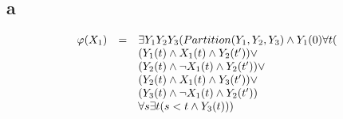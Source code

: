 \documentclass[10pt]{article}
\begin{document}
    \subsection*{a}
      \begin{displaymath}
        \begin{array}{c c l}
          \varphi(X_{1}) & = & 
            \exists Y_{1} Y_{2} Y_{3} (
            Partition(Y_{1},Y_{2},Y_{3}) \land Y_{1}(0)
            \forall t ( \\
          &  &  (Y_{1}(t) \land X_{1}(t) \land Y_{2}(t^\prime)) \lor\\ 
          &  &  (Y_{2}(t) \land \neg X_{1}(t) \land Y_{2}(t^\prime)) \lor\\ 
          &  &  (Y_{2}(t) \land X_{1}(t) \land Y_{3}(t^\prime)) \lor     \\ 
          &  &  (Y_{3}(t) \land \neg X_{1}(t) \land Y_{2}(t^\prime))     \\ 
          &  &  \forall s \exists t ( s < t \land Y_{3}(t) ))\\
        \end{array}
      \end{displaymath}
\end{document}
